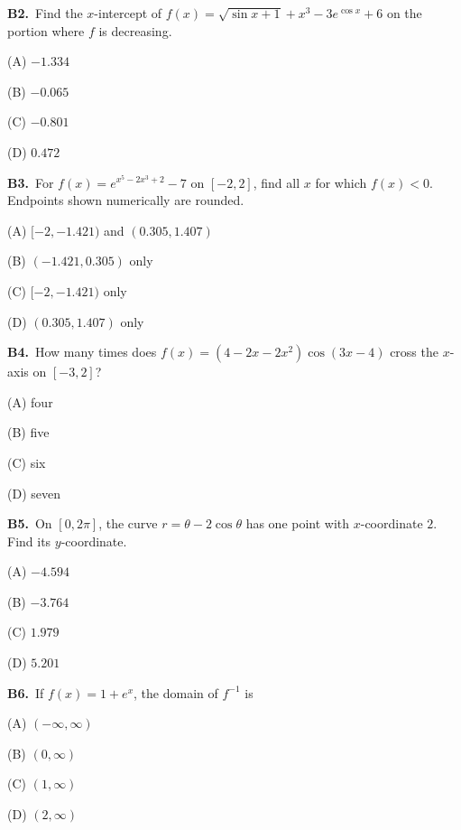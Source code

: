 \documentclass[11pt]{article}
\begin{document}
\bigskip\noindent\textbf{B2.}\ Find the $x$-intercept of $f(x)=\sqrt{\sin x+1}+x^3-3e^{\cos x}+6$ on the portion where $f$ is decreasing.
\begin{list}{}{\setlength{\leftmargin}{3em}\setlength{\labelwidth}{2.5em}\setlength{\itemsep}{0pt}\setlength{\topsep}{2pt}}
\item[(A)] $-1.334$
\item[(B)] $-0.065$
\item[(C)] $-0.801$
\item[(D)] $0.472$
\end{list}

\bigskip\noindent\textbf{B3.}\ For $f(x)=e^{x^5-2x^3+2}-7$ on $[-2,2]$, find all $x$ for which $f(x)<0$. Endpoints shown numerically are rounded.
\begin{list}{}{\setlength{\leftmargin}{3em}\setlength{\labelwidth}{2.5em}\setlength{\itemsep}{0pt}\setlength{\topsep}{2pt}}
\item[(A)] $[-2,-1.421)$ and $(0.305,1.407)$
\item[(B)] $(-1.421,0.305)$ only
\item[(C)] $[-2,-1.421)$ only
\item[(D)] $(0.305,1.407)$ only
\end{list}

\bigskip\noindent\textbf{B4.}\ How many times does $f(x)=(4-2x-2x^2)\cos(3x-4)$ cross the $x$-axis on $[-3,2]$?
\begin{list}{}{\setlength{\leftmargin}{3em}\setlength{\labelwidth}{2.5em}\setlength{\itemsep}{0pt}\setlength{\topsep}{2pt}}
\item[(A)] four
\item[(B)] five
\item[(C)] six
\item[(D)] seven
\end{list}

\bigskip\noindent\textbf{B5.}\ On $[0,2\pi]$, the curve $r=\theta-2\cos\theta$ has one point with $x$-coordinate $2$. Find its $y$-coordinate.
\begin{list}{}{\setlength{\leftmargin}{3em}\setlength{\labelwidth}{2.5em}\setlength{\itemsep}{0pt}\setlength{\topsep}{2pt}}
\item[(A)] $-4.594$
\item[(B)] $-3.764$
\item[(C)] $1.979$
\item[(D)] $5.201$
\end{list}

\bigskip\noindent\textbf{B6.}\ If $f(x)=1+e^x$, the domain of $f^{-1}$ is
\begin{list}{}{\setlength{\leftmargin}{3em}\setlength{\labelwidth}{2.5em}\setlength{\itemsep}{0pt}\setlength{\topsep}{2pt}}
\item[(A)] $(-\infty,\infty)$
\item[(B)] $(0,\infty)$
\item[(C)] $(1,\infty)$
\item[(D)] $(2,\infty)$
\end{list}
\end{document}
